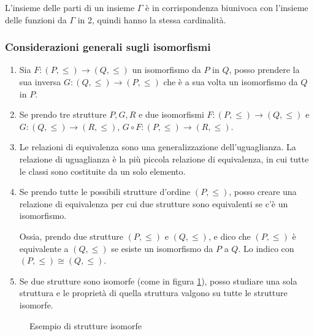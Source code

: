 L'insieme delle parti di un insieme $\Gamma$ \`e in corrispondenza biunivoca con l'insieme delle funzioni da $\Gamma$ in 2, quindi hanno la stessa cardinalit\`a.

\subsubsection{Considerazioni generali sugli isomorfismi}

\begin{enumerate}
  \item Sia $F : (P, \le) \to (Q, \le)$ un isomorfismo da $P$ in $Q$, posso prendere la sua inversa $G : (Q, \le) \to (P, \le)$ che \`e a sua volta un isomorfismo da $Q$ in $P$.
  \item Se prendo tre strutture $P, G, R$ e due isomorfismi $F : (P, \le) \to (Q, \le)$ e $G : (Q, \le) \to (R, \le)$, $G \circ F : (P, \le) \to (R, \le)$.
  \item Le relazioni di equivalenza sono una generalizzazione dell'uguaglianza. La relazione di uguaglianza \`e la pi\`u piccola relazione di equivalenza, in cui tutte le classi sono costituite da un solo elemento.
  \item Se prendo tutte le possibili strutture d'ordine $(P, \le)$, posso creare una relazione di equivalenza per cui due strutture sono equivalenti se c'\`e un isomorfismo.

  Ossia, prendo due strutture $(P, \le)$ e $(Q, \le)$, e dico che $(P, \le)$ \`e equivalente a $(Q, \le)$ se esiste un isomorfismo da $P$ a $Q$. Lo indico con $(P, \le) \cong (Q, \le)$.
  \item Se due strutture sono isomorfe (come in figura \ref{fig:strutture_isomorfe}), posso studiare una sola struttura e le propriet\`a di quella struttura valgono su tutte le strutture isomorfe.
\end{enumerate}

\begin{figure}
\centering
{}
\caption{\label{fig:strutture_isomorfe}Esempio di strutture isomorfe}
\end{figure}

